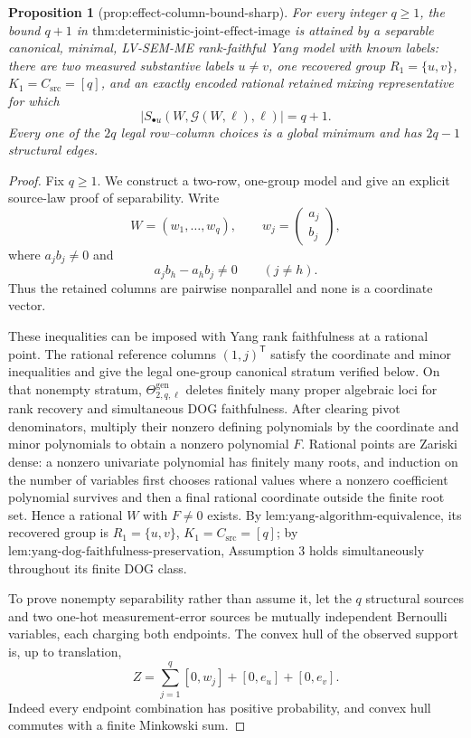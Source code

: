 \documentclass{article}
\newtheorem{proposition}{Proposition}
\begin{document}
\begin{proposition}[prop:effect-column-bound-sharp]\label{prop:effect-column-bound-sharp}
For every integer \(q\ge1\), the bound \(q+1\) in \(\text{thm:deterministic-joint-effect-image}\) is attained by a separable canonical, minimal, LV-SEM-ME rank-faithful Yang model with known labels: there are two measured substantive labels \(u\ne v\), one recovered group \(R_1=\{u,v\}\), \(K_1=C_{\mathrm{src}}=[q]\), and an exactly encoded rational retained mixing representative for which
\[
|S_{\bullet u}(W,\mathcal G(W,\ell),\ell)|=q+1.
\]
Every one of the \(2q\) legal row--column choices is a global minimum and has \(2q-1\) structural edges.
\end{proposition}
\begin{proof}
Fix \(q\ge1\). We construct a two-row, one-group model and give an explicit source-law proof of separability. Write
\[
W=(w_1,\ldots,w_q),\qquad w_j=\begin{pmatrix}a_j\\b_j\end{pmatrix},
\]
where \(a_jb_j\ne0\) and
\[
a_jb_h-a_hb_j\ne0\qquad(j\ne h).
\]
Thus the retained columns are pairwise nonparallel and none is a coordinate vector.

These inequalities can be imposed with Yang rank faithfulness at a rational point. The rational reference columns \((1,j)^{\mathsf T}\) satisfy the coordinate and minor inequalities and give the legal one-group canonical stratum verified below. On that nonempty stratum, \(\Theta_{2,q,\ell}^{\mathrm{gen}}\) deletes finitely many proper algebraic loci for rank recovery and simultaneous DOG faithfulness. After clearing pivot denominators, multiply their nonzero defining polynomials by the coordinate and minor polynomials to obtain a nonzero polynomial \(F\). Rational points are Zariski dense: a nonzero univariate polynomial has finitely many roots, and induction on the number of variables first chooses rational values where a nonzero coefficient polynomial survives and then a final rational coordinate outside the finite root set. Hence a rational \(W\) with \(F\ne0\) exists. By \(\text{lem:yang-algorithm-equivalence}\), its recovered group is \(R_1=\{u,v\}\), \(K_1=C_{\mathrm{src}}=[q]\); by \(\text{lem:yang-dog-faithfulness-preservation}\), Assumption 3 holds simultaneously throughout its finite DOG class.

To prove nonempty separability rather than assume it, let the \(q\) structural sources and two one-hot measurement-error sources be mutually independent Bernoulli variables, each charging both endpoints. The convex hull of the observed support is, up to translation,
\[
Z=\sum_{j=1}^{q}[0,w_j]+[0,e_u]+[0,e_v].
\]
Indeed every endpoint combination has positive probability, and convex hull commutes with a finite Minkowski sum.


\end{proof}
\end{document}
